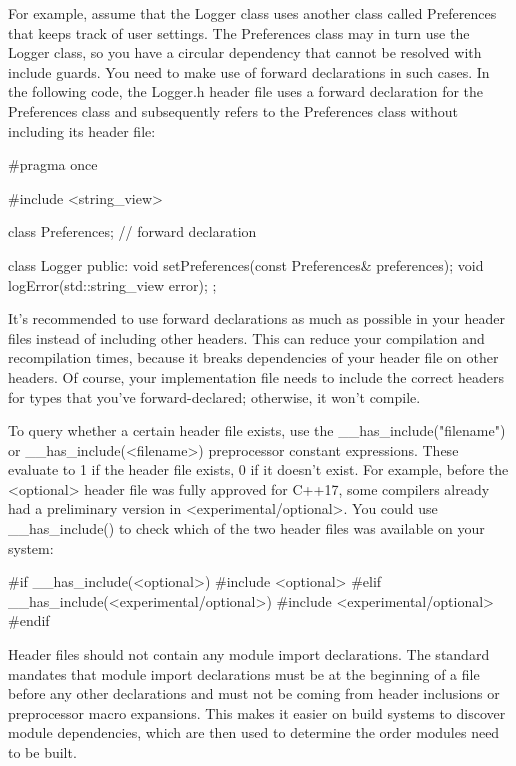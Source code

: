 For example, assume that the Logger class uses another class called Preferences that keeps track of user settings. The Preferences class may in turn use the Logger class, so you have a circular dependency that cannot be resolved with include guards. You need to make use of forward declarations in such cases. In the following code, the Logger.h header file uses a forward declaration for the Preferences class and subsequently refers to the Preferences class without including its header file:

\begin{cpp}
#pragma once

#include <string_view>

class Preferences; // forward declaration

class Logger
{
    public:
        void setPreferences(const Preferences& preferences);
        void logError(std::string_view error);
};
\end{cpp}

It’s recommended to use forward declarations as much as possible in your header files instead of including other headers. This can reduce your compilation and recompilation times, because it breaks dependencies of your header file on other headers. Of course, your implementation file needs to include the correct headers for types that you’ve forward-declared; otherwise, it won’t compile.


To query whether a certain header file exists, use the \_\_has\_include("filename") or \_\_has\_include(<filename>) preprocessor constant expressions. These evaluate to 1 if the header file exists, 0 if it doesn’t exist. For example, before the <optional> header file was fully approved for C++17, some compilers already had a preliminary version in <experimental/optional>. You could use \_\_has\_include() to check which of the two header files was available on your system:

\begin{cpp}
#if __has_include(<optional>)
    #include <optional>
#elif __has_include(<experimental/optional>)
    #include <experimental/optional>
#endif
\end{cpp}


Header files should not contain any module import declarations. The standard mandates that module import declarations must be at the beginning of a file before any other declarations and must not be coming from header inclusions or preprocessor macro expansions. This makes it easier on build systems to discover module dependencies, which are then used to determine the order modules need to be built.
















